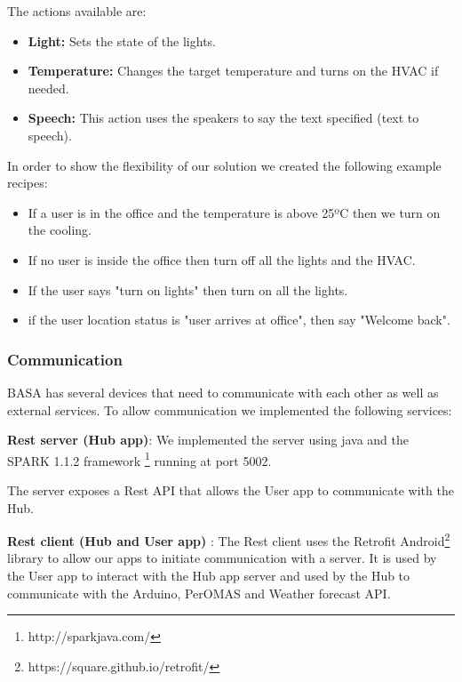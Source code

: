 \documentclass[conference]{IEEEtran}
\begin{document}
The actions available are:

\begin{itemize}
  \item \textbf{Light:} Sets the state of the lights.
  \item \textbf{Temperature:} Changes the target temperature and turns on the HVAC if needed.
  \item \textbf{Speech:} This action uses the speakers to say the text specified (text to speech).
\end{itemize}

In order to show the flexibility of our solution we created the following example recipes:
\begin{itemize}
  \item If a user is in the office and the temperature is above 25ºC then we turn on the cooling.
  \item If no user is inside the office then turn off all the lights and the HVAC.
  \item If the user says "turn on lights" then turn on all the lights.
  \item if the user location status is "user arrives at office", then say "Welcome back".
 
\end{itemize}








\subsubsection{Communication}

BASA has several devices that need to communicate with each other as well as external services. To allow communication we implemented the following services:


\textbf{Rest server (Hub app)}: We implemented the server using java and the SPARK 1.1.2 framework \footnote{http://sparkjava.com/} running at port 5002.

The server exposes a Rest API that allows the User app to communicate with the Hub.

\textbf{Rest client (Hub and User app) }: The Rest client  uses the Retrofit Android\footnote{https://square.github.io/retrofit/}  library to allow our apps to initiate communication with a server. It is used by the User app to interact with the Hub app server and used by the Hub to communicate with the Arduino, PerOMAS and Weather forecast API.
\end{document}

